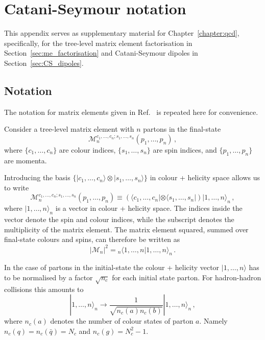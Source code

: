 \documentclass[main.tex]{subfiles}
\begin{document}
\chapter{Catani-Seymour notation}
\label{appendix:catani_seymour}
    This appendix serves as supplementary material for Chapter~\ref{chapter:qcd},
    specifically, for the tree-level matrix element factorisation in Section~\ref{sec:me_factorisation}
    and Catani-Seymour dipoles in Section~\ref{sec:CS_dipoles}.
    \section{Notation}
    The notation for matrix elements given in Ref.~\cite{Catani:1996vz}
    is repeated here for convenience.

    Consider a tree-level matrix element with $n$ partons in
    the final-state
    \begin{equation}\label{eqn:CS_ME}
        \mathcal{M}^{c_{1},\ldots,c_{n};s_{1},\ldots,s_{n}}_{n}(p_{1},\ldots,p_{n}) \, ,
    \end{equation}
    where $\{c_{1},\ldots,c_{n}\}$ are colour indices,
    $\{s_{1},\ldots,s_{n}\}$ are spin indices,
    and $\{p_{1},\ldots,p_{n}\}$ are momenta.

    Introducing the basis $\{| c_{1},\ldots,c_{n} \rangle \otimes | s_{1},\ldots,s_{n} \rangle \}$
    in colour + helicity space allows us to write
    \begin{equation}\label{eqn:CS_hilbert}
        \mathcal{M}^{c_{1},\ldots,c_{n};s_{1},\ldots,s_{n}}_{n}(p_{1},\ldots,p_{n}) \equiv \left(\langle c_{1},\ldots,c_{n} | \otimes \langle s_{1},\ldots,s_{n} | \right) | 1, \ldots,n \rangle_{n} \, ,
    \end{equation}
    where $|1, \ldots, n \rangle_{n}$ is a vector in colour + helicity space.
    The indices inside the vector denote the spin and colour indices,
    while the subscript denotes the multiplicity of the matrix element.
    The matrix element squared, summed over final-state colours and spins,
    can therefore be written as
    \begin{equation}\label{eqn:CS_ME2}
        |\mathcal{M}_{n}|^{2} = {}_{n} \langle 1,\ldots,n|1,\ldots,n\rangle_{n} \, .
    \end{equation}

    In the case of partons in the initial-state the colour + helicity vector
    $|1, \ldots, n \rangle$ has to be normalised by a factor $\sqrt{n_{c}}$ for each
    initial state parton. For hadron-hadron collisions this amounts to
    \begin{equation}
        | 1, \ldots, n \rangle_{n} \rightarrow \dfrac{1}{\sqrt{n_{c}(a)n_{c}(b)}} | 1, \ldots, n \rangle_{n} \, ,
    \end{equation}
    where $n_{c}(a)$ denotes the number of colour states of parton $a$.
    Namely $n_{c}(q) = n_{c}(\bar{q}) = N_{c}$ and $n_{c}(g) = N_{c}^{2}-1$.
\end{document}
